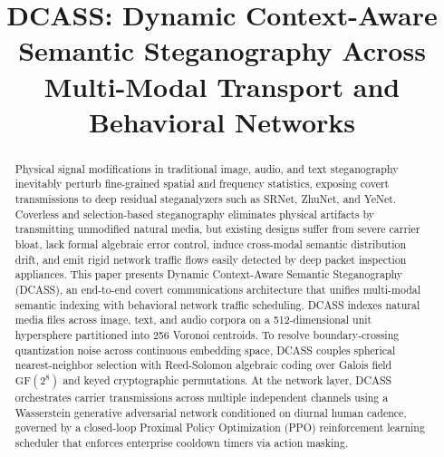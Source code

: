 \documentclass[11pt,journal,onecolumn]{IEEEtran}\linespread{1.3}
\begin{document}
\title{DCASS: Dynamic Context-Aware Semantic Steganography Across Multi-Modal Transport and Behavioral Networks}

\author{
}

\maketitle

\begin{abstract}
Physical signal modifications in traditional image, audio, and text steganography inevitably perturb fine-grained spatial and frequency statistics, exposing covert transmissions to deep residual steganalyzers such as SRNet, ZhuNet, and YeNet. Coverless and selection-based steganography eliminates physical artifacts by transmitting unmodified natural media, but existing designs suffer from severe carrier bloat, lack formal algebraic error control, induce cross-modal semantic distribution drift, and emit rigid network traffic flows easily detected by deep packet inspection appliances. This paper presents Dynamic Context-Aware Semantic Steganography (DCASS), an end-to-end covert communications architecture that unifies multi-modal semantic indexing with behavioral network traffic scheduling. DCASS indexes natural media files across image, text, and audio corpora on a 512-dimensional unit hypersphere partitioned into 256 Voronoi centroids. To resolve boundary-crossing quantization noise across continuous embedding space, DCASS couples spherical nearest-neighbor selection with Reed-Solomon algebraic coding over Galois field $\text{GF}(2^8)$ and keyed cryptographic permutations. At the network layer, DCASS orchestrates carrier transmissions across multiple independent channels using a Wasserstein generative adversarial network conditioned on diurnal human cadence, governed by a closed-loop Proximal Policy Optimization (PPO) reinforcement learning scheduler that enforces enterprise cooldown timers via action masking.


\end{abstract}
\end{document}

